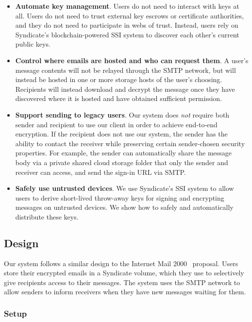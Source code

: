 \begin{itemize}
\item \textbf{Automate key management}.  Users do not need to interact with keys
at all.  Users do not need to trust external key escrows or certificate
authorities, and they do not need to participate in webs of trust.  Instead,
users rely on Syndicate's blockchain-powered SSI system to discover each other's
current public keys.

\item \textbf{Control where emails are hosted and who can request them}.
A user's message contents will
not be relayed through the SMTP network, but will instead be hosted in one or
more storage hosts of the user's choosing.  Recipients will instead download and
decrypt the message once they have discovered where it is hosted and have
obtained sufficient permission.

\item \textbf{Support sending to legacy users}.  Our system does \emph{not}
require both sender and recipient to use our client in order to achieve
end-to-end encryption.  If the recipient does not use our system, the sender has
the ability to contact the receiver while
preserving certain sender-chosen security properties.  For example, 
the sender can automatically share the message body via a private shared cloud storage folder
that only the sender and receiver can access, and send the sign-in URL via SMTP.

\item \textbf{Safely use untrusted devices}.  We use Syndicate's SSI system to
allow users to derive short-lived throw-away keys for signing and encrypting
messages on untrusted devices.  We show how to safely and automatically
distribute these keys.
\end{itemize}

\subsection{Design}

Our system follows a similar design to the Internet Mail
2000~\cite{internet-mail-2000}
proposal.  Users store their encrypted emails in a Syndicate volume, which they
use to selectively give recipients access to their messages.  The system uses
the SMTP network to allow senders to inform receivers when they have new
messages waiting for them.

\subsubsection{Setup}

